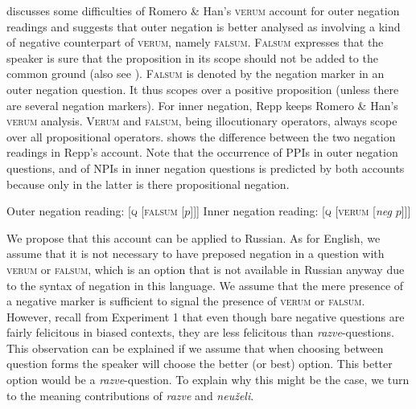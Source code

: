 \documentclass[output=paper,colorlinks,citecolor=brown]{langscibook}
\begin{document}
\citet{Repp06, repp_negation_2009} discusses some difficulties of Romero \& Han's \textsc{verum} account for outer negation readings and suggests that outer negation is better analysed as involving a kind of negative counterpart of \textsc{verum}, namely \textsc{falsum}. \textsc{Falsum} expresses that the speaker is sure that the proposition in its scope should not be added to the common ground (also see \citealt{Romero15}). \textsc{Falsum} is denoted by the negation marker in an outer negation question. It thus scopes over a positive proposition (unless there are several negation markers). For inner negation, Repp keeps Romero \& Han's \textsc{verum} analysis. \textsc{Verum} and \textsc{falsum}, being illocutionary operators, always scope over all propositional operators.  shows the difference between the two negation readings in Repp's account. Note that the occurrence of PPIs in outer negation questions, and of NPIs in inner negation questions is predicted by both accounts because only in the latter is there propositional negation.

\ea \label{ex:05:op}
\ea \label{ex:05:op:out}
Outer negation reading: [\textsc{q} [\textsc{falsum} [$p$]]]
\ex \label{ex:05:op:in}
Inner negation reading: [\textsc{q} [\textsc{verum} [\textit{neg} $p$]]]
\z
\z

\largerpage
We propose that this account can be applied to Russian. As for English, we assume that it is not necessary to have preposed negation in a question with \textsc{verum} or \textsc{falsum}, which is an option that is not available in Russian anyway due to the syntax of negation in this language. We assume that the mere presence of a negative marker is sufficient to signal the presence of \textsc{verum} or \textsc{falsum}. However, recall from Experiment 1 that even though bare negative questions are fairly felicitous in biased contexts, they are less felicitous than \textit{razve}-questions. This observation can be explained if we assume that when choosing between question forms the speaker will choose the better (or best) option. This better option would be a \textit{razve}-question. To explain why this might be the case, we turn to the meaning contributions of \textit{razve} and \textit{neuželi}.
\end{document}
